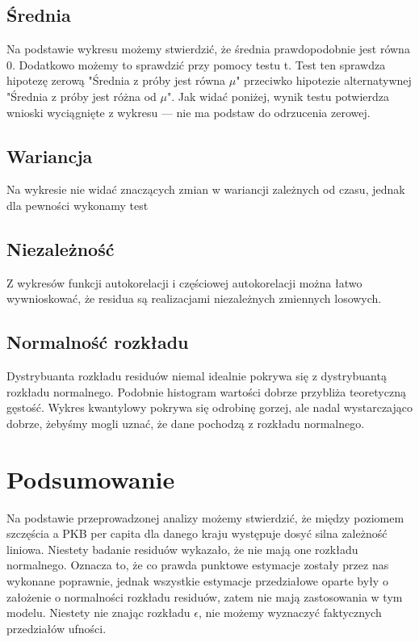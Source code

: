 \documentclass{article}
\theoremstyle{break}
\begin{document}
\subsection{Średnia}
Na podstawie wykresu możemy stwierdzić, że średnia prawdopodobnie jest równa 0. Dodatkowo możemy to sprawdzić przy pomocy testu t. Test ten sprawdza hipotezę zerową "Średnia z próby jest równa $\mu$" przeciwko hipotezie alternatywnej "Średnia z próby jest różna od $\mu$". Jak widać poniżej, wynik testu potwierdza wnioski wyciągnięte z wykresu — nie ma podstaw do odrzucenia zerowej.

\subsection{Wariancja}
Na wykresie nie widać znaczących zmian w wariancji zależnych od czasu, jednak dla pewności wykonamy test 

\subsection{Niezależność}
Z wykresów funkcji autokorelacji i częściowej autokorelacji można łatwo wywnioskować, że residua są realizacjami niezależnych zmiennych losowych.
\subsection{Normalność rozkładu}
 Dystrybuanta rozkładu residuów niemal idealnie pokrywa się z dystrybuantą rozkładu normalnego. Podobnie histogram wartości dobrze przybliża teoretyczną gęstość. Wykres kwantylowy pokrywa się odrobinę gorzej, ale nadal wystarczająco dobrze, żebyśmy mogli uznać, że dane pochodzą z rozkładu normalnego.


	\section{Podsumowanie}
	
	Na podstawie przeprowadzonej analizy możemy stwierdzić, że między poziomem szczęścia a PKB per capita dla danego kraju występuje dosyć silna zależność liniowa. Niestety badanie residuów wykazało, że nie mają one rozkładu normalnego. Oznacza to, że co prawda punktowe estymacje zostały przez nas wykonane poprawnie, jednak wszystkie estymacje przedziałowe oparte były o założenie o normalności rozkładu residuów, zatem nie mają zastosowania w tym modelu. Niestety nie znając rozkładu $\epsilon$, nie możemy wyznaczyć faktycznych przedziałów ufności.
	
\end{document}
